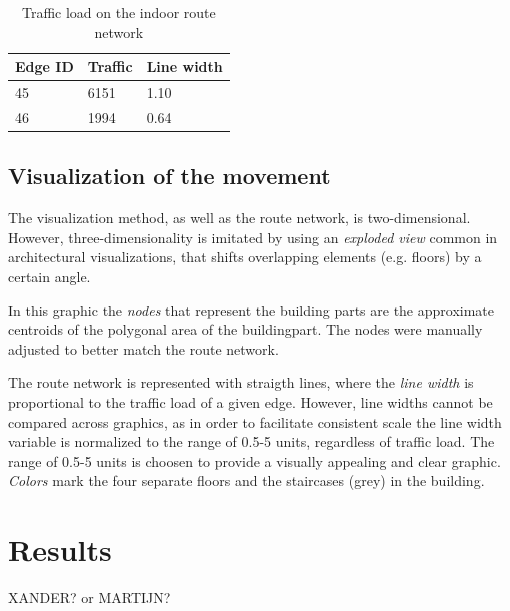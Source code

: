 \begin{table}[H]
\centering
\caption{Traffic load on the indoor route network}
\label{table:traffic}
\begin{tabular}{@{}lll@{}}
\toprule
Edge ID & Traffic & Line width \\ \midrule
45      & 6151    & 1.10       \\
46      & 1994    & 0.64       \\ \bottomrule
\end{tabular}
\end{table}


\subsection{Visualization of the movement}
The visualization method, as well as the route network, is two-dimensional.
However, three-dimensionality is imitated by using an \textit{exploded view}
common in architectural visualizations, that shifts overlapping elements (e.g.
floors) by a certain angle.

In this graphic the \textit{nodes} that represent the building parts are the approximate centroids of the polygonal area of the buildingpart. The nodes were manually adjusted
to better match the route network.

The route network is represented with
straigth lines, where the \textit{line width} is proportional to the traffic
load of a given edge. However, line widths cannot be compared across graphics, as in order
to facilitate consistent scale the line width variable is normalized to
the range of 0.5-5 units, regardless of traffic load. The range of 0.5-5 units
is choosen to provide a visually appealing and clear graphic. \textit{Colors}
mark the four separate floors and the staircases (grey) in the building.

\section{Results}

XANDER? or MARTIJN?
